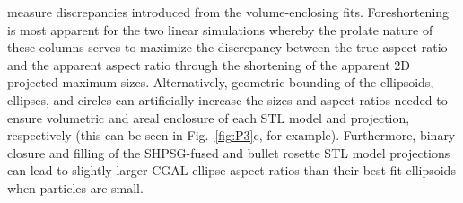 \documentclass[amt, manuscript]{copernicus}
\begin{document}
measure discrepancies introduced from the volume-enclosing fits. Foreshortening is most apparent for the two linear simulations whereby the prolate nature of these columns serves to maximize the discrepancy between the true aspect ratio and the apparent aspect ratio through the shortening of the apparent 2D projected maximum sizes. Alternatively, geometric bounding of the ellipsoids, ellipses, and circles can artificially increase the sizes and aspect ratios needed to ensure volumetric and areal enclosure of each STL model and projection, respectively (this can be seen in Fig.~\ref{fig:P3}c, for example). Furthermore, binary closure and filling of the SHPSG-fused and bullet rosette STL model projections can lead to slightly larger CGAL ellipse aspect ratios than their best-fit ellipsoids when particles are small.
\end{document}
